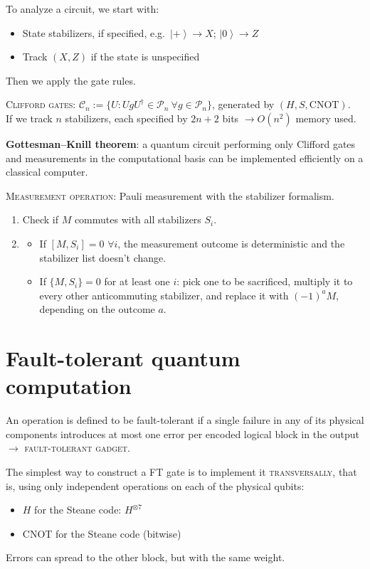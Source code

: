 \documentclass[11pt,a4paper]{article}
\renewcommand{\ket}[1]{\left|#1\right\rangle}
\begin{document}
To analyze a circuit, we start with:
\begin{itemize}
  \item State stabilizers, if specified, e.g.\ $\ket+\to X$; $\ket0\to Z$
  \item Track $(X,Z)$ if the state is unspecified
\end{itemize}
Then we apply the gate rules.

\textsc{Clifford gates}: $\mathcal C_n := \bigl\{U : UgU^\dagger\in\mathcal P_n\ \forall g\in\mathcal P_n\bigr\}$, generated by $(H,S,\mathrm{CNOT})$.\\
If we track $n$ stabilizers, each specified by $2n+2$ bits $\to O(n^2)$ memory used.

\textbf{Gottesman--Knill theorem}: a quantum circuit performing only Clifford gates and measurements in the computational basis can be implemented efficiently on a classical computer.

\textsc{Measurement operation}: Pauli measurement with the stabilizer formalism.
\begin{enumerate}
  \item Check if $M$ commutes with all stabilizers $S_i$.
  \item \begin{itemize}
    \item If $[M,S_i] = 0$ $\forall i$, the measurement outcome is deterministic and the stabilizer list doesn't change.
    \item If $\{M,S_i\} = 0$ for at least one $i$: pick one to be sacrificed, multiply it to every other anticommuting stabilizer, and replace it with $(-1)^aM$, depending on the outcome $a$.
  \end{itemize}
\end{enumerate}

\section{Fault-tolerant quantum computation}

An operation is defined to be fault-tolerant if a single failure in any of its physical components introduces at most one error per encoded logical block in the output $\to$ \textsc{fault-tolerant gadget}.

The simplest way to construct a FT gate is to implement it \textsc{transversally}, that is, using only independent operations on each of the physical qubits:
\begin{itemize}[label=$\to$]
  \item $H$ for the Steane code: $H^{\otimes7}$
  \item CNOT for the Steane code (bitwise)
\end{itemize}
Errors can spread to the other block, but with the same weight.
\end{document}

